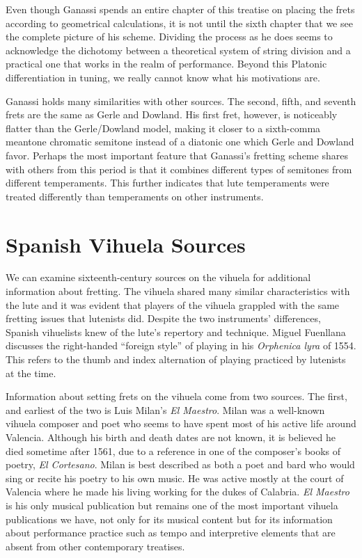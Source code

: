 Even though Ganassi spends an entire chapter of this treatise on placing the frets according to geometrical
calculations, it is not until the sixth chapter that we see the complete picture of his scheme. Dividing the process as
he does seems to acknowledge the dichotomy between a theoretical system of string division and a practical one that
works in the realm of performance. Beyond this Platonic differentiation in tuning, we really cannot know what his
motivations are.

Ganassi holds many similarities with other sources. The second, fifth, and seventh frets are the same as Gerle and
Dowland. His first fret, however, is noticeably flatter than the Gerle/Dowland model, making it closer to a sixth-comma
meantone chromatic semitone instead of a diatonic one which Gerle and Dowland favor. Perhaps the most important feature
that Ganassi's fretting scheme shares with others from this period is that it combines different types of semitones from
different temperaments. This further indicates that lute temperaments were treated differently than temperaments on
other instruments.

\section{Spanish Vihuela Sources}

We can examine sixteenth-century sources on the vihuela for additional information about fretting.
The vihuela shared many similar characteristics with the lute and it was evident that players of the
vihuela grappled with the same fretting issues that lutenists did. Despite the two instruments'
differences, Spanish vihuelists knew of the lute's repertory and technique. Miguel Fuenllana
discusses the right-handed ``foreign style'' of playing in his \textit{Orphenica lyra} of
1554. This refers to the thumb and index alternation of playing practiced by lutenists at the time.

Information about setting frets on the vihuela come from two sources. The first, and
earliest of the two is Luis Milan's \textit{El Maestro}. Milan was a well-known vihuela
composer and poet who seems to have spent most of his active life around Valencia.
Although his birth and death dates are not known, it is believed he died sometime
after 1561, due to a reference in one of the composer's books of poetry, \textit{El
Cortesano}.\autocite[6]{LG:1} Milan is best described as both a poet and bard who
would sing or recite his poetry to his own music. He was active mostly at the court of
Valencia where he made his living working for the dukes of Calabria. \textit{El
Maestro} is his only musical publication but remains one of the most important vihuela
publications we have, not only for its musical content but for its information about
performance practice such as tempo and interpretive elements that are absent from
other contemporary treatises.


